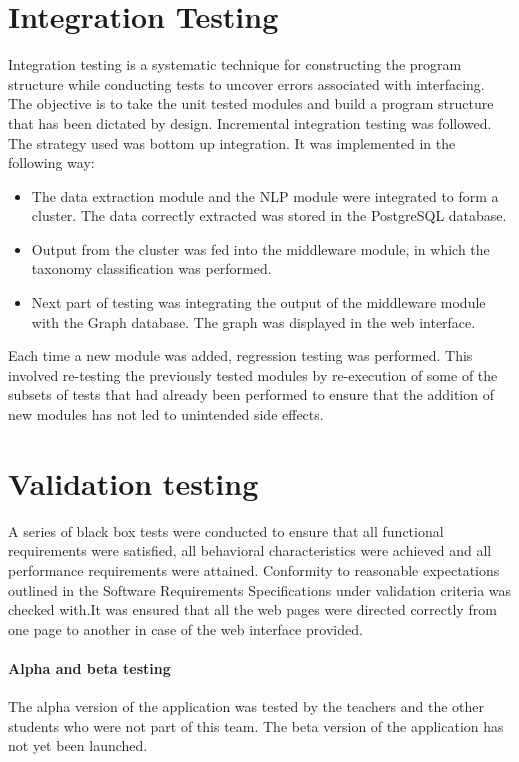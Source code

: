 \section{Integration Testing}
Integration testing is a systematic technique for constructing the program structure while conducting tests to uncover errors associated with interfacing. The objective is to take the unit tested modules and build a program structure that has been dictated by design.
Incremental integration testing was followed. The strategy used was bottom up integration. It was implemented in the following way:
\begin{itemize}
\item The data extraction module and the NLP module were integrated to form a cluster. The data correctly extracted was stored in the PostgreSQL database.
\item Output from the cluster was fed into the middleware module, in which the taxonomy classification was performed.
\item Next part of testing was integrating the output of the middleware module with the Graph database. The graph was displayed in the web interface.
\end{itemize}
Each time a new module was added, regression testing was performed. This involved re-testing the previously tested modules by re-execution of some of the subsets of tests that had already been performed to ensure that the addition of new modules has not led to unintended side effects. 

\section{Validation testing}
\par
A series of black box tests were conducted to ensure that all functional requirements were satisfied, all behavioral characteristics were achieved and all performance requirements were attained. Conformity to reasonable expectations outlined in the Software Requirements Specifications under validation criteria was checked with.It was ensured that all the web pages were directed correctly from one page to another in case of the web interface provided. 
\paragraph*{Alpha and beta testing}The alpha version of the application was tested by the teachers and the other students who were not part of this team. The beta version of the application has not yet been launched.

